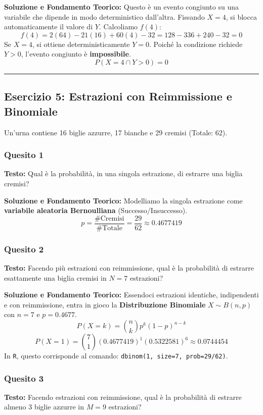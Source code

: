\documentclass[12pt, a4paper]{article}
\begin{document}
\textbf{Soluzione e Fondamento Teorico:} 
Questo è un evento congiunto su una variabile che dipende in modo deterministico dall'altra. Fissando $X=4$, si blocca automaticamente il valore di $Y$. Calcoliamo $f(4)$:
$$ f(4) = 2(64) - 21(16) + 60(4) - 32 = 128 - 336 + 240 - 32 = 0 $$
Se $X=4$, si ottiene deterministicamente $Y=0$. Poiché la condizione richiede $Y>0$, l'evento congiunto è \textbf{impossibile}.
$$ P(X=4 \cap Y>0) = 0 $$

\vspace{0.5cm}\hrule\vspace{0.5cm}

\subsection*{Esercizio 5: Estrazioni con Reimmissione e Binomiale}
Un'urna contiene 16 biglie azzurre, 17 bianche e 29 cremisi (Totale: 62).

\subsubsection*{Quesito 1}
\textbf{Testo:} Qual è la probabilità, in una singola estrazione, di estrarre una biglia cremisi?

\textbf{Soluzione e Fondamento Teorico:} 
Modelliamo la singola estrazione come \textbf{variabile aleatoria Bernoulliana} (Successo/Insuccesso).
$$ p = \frac{\#\text{Cremisi}}{\#\text{Totale}} = \frac{29}{62} \approx 0.4677419 $$

\subsubsection*{Quesito 2}
\textbf{Testo:} Facendo più estrazioni con reimmissione, qual è la probabilità di estrarre esattamente una biglia cremisi in $N=7$ estrazioni?

\textbf{Soluzione e Fondamento Teorico:} 
Essendoci estrazioni identiche, indipendenti e con reimmissione, entra in gioco la \textbf{Distribuzione Binomiale} $X \sim B(n,p)$ con $n=7$ e $p=0.4677$.
$$ P(X=k) = \binom{n}{k} p^k (1-p)^{n-k} $$
$$ P(X=1) = \binom{7}{1} (0.4677419)^1 (0.5322581)^6 \approx 0.0744454 $$
In \texttt{R}, questo corrisponde al comando: \texttt{dbinom(1, size=7, prob=29/62)}.

\subsubsection*{Quesito 3}
\textbf{Testo:} Facendo estrazioni con reimmissione, qual è la probabilità di estrarre almeno 3 biglie azzurre in $M=9$ estrazioni?
\end{document}
